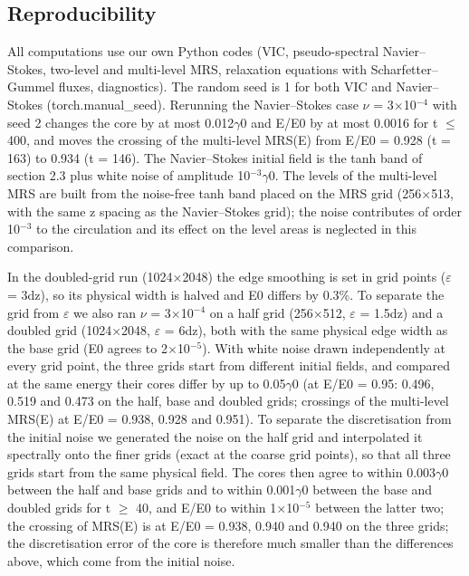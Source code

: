 \documentclass[11pt]{article}
\begin{document}
\subsection{Reproducibility}
All computations use our own Python codes (VIC, pseudo-spectral Navier--Stokes, two-level and multi-level MRS, relaxation equations with Scharfetter--Gummel fluxes, diagnostics). The random seed is 1 for both VIC and Navier--Stokes (torch.manual\_seed). Rerunning the Navier--Stokes case $\nu{}$ = 3$\times{}$10$^{-4}$ with seed 2 changes the core by at most 0.012$\gamma{}$0 and E/E0 by at most 0.0016 for t $\le{}$ 400, and moves the crossing of the multi-level MRS(E) from E/E0 = 0.928 (t = 163) to 0.934 (t = 146). The Navier--Stokes initial field is the tanh band of section 2.3 plus white noise of amplitude 10$^{-3}\gamma{}$0. The levels of the multi-level MRS are built from the noise-free tanh band placed on the MRS grid (256$\times{}$513, with the same z spacing as the Navier--Stokes grid); the noise contributes of order 10$^{-3}$ to the circulation and its effect on the level areas is neglected in this comparison.

In the doubled-grid run (1024$\times{}$2048) the edge smoothing is set in grid points ($\varepsilon{}$ = 3dz), so its physical width is halved and E0 differs by 0.3\%. To separate the grid from $\varepsilon{}$ we also ran $\nu{}$ = 3$\times{}$10$^{-4}$ on a half grid (256$\times{}$512, $\varepsilon{}$ = 1.5dz) and a doubled grid (1024$\times{}$2048, $\varepsilon{}$ = 6dz), both with the same physical edge width as the base grid (E0 agrees to 2$\times{}$10$^{-5}$). With white noise drawn independently at every grid point, the three grids start from different initial fields, and compared at the same energy their cores differ by up to 0.05$\gamma{}$0 (at E/E0 = 0.95: 0.496, 0.519 and 0.473 on the half, base and doubled grids; crossings of the multi-level MRS(E) at E/E0 = 0.938, 0.928 and 0.951). To separate the discretisation from the initial noise we generated the noise on the half grid and interpolated it spectrally onto the finer grids (exact at the coarse grid points), so that all three grids start from the same physical field. The cores then agree to within 0.003$\gamma{}$0 between the half and base grids and to within 0.001$\gamma{}$0 between the base and doubled grids for t $\ge{}$ 40, and E/E0 to within 1$\times{}$10$^{-5}$ between the latter two; the crossing of MRS(E) is at E/E0 = 0.938, 0.940 and 0.940 on the three grids; the discretisation error of the core is therefore much smaller than the differences above, which come from the initial noise.
\end{document}
